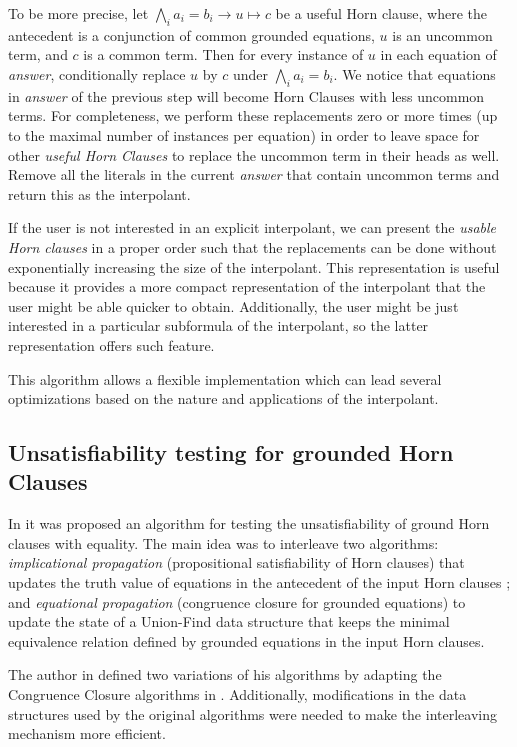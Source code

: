 \documentclass[10pt, sigconf,authordraft]{acmart}
\begin{document}
\begin{itemize}
  To be more precise, let $\bigwedge_i a_i = b_i \rightarrow u \mapsto c$ be a useful Horn clause,
  where the antecedent is a conjunction of common grounded equations, $u$ is an uncommon term,
  and $c$ is a common term.
  Then for every instance of $u$ in each equation of \emph{answer}, conditionally replace $u$
  by $c$ under $\bigwedge_i a_i = b_i$.
  We notice that equations in \emph{answer}  of the previous step will become Horn Clauses with
  less uncommon terms. For completeness, we perform these replacements zero or more times
  (up to the maximal number of instances per equation) in order to leave space for other
  \emph{useful Horn Clauses} to replace the uncommon term in their heads as well.
  Remove all the literals in the current \emph{answer} that contain uncommon terms and return this
  as the interpolant.
\end{itemize}

If the user is not interested in an explicit interpolant, we can present the \emph{usable Horn
  clauses} in a proper order such that the replacements can be done without exponentially increasing
the size of the interpolant. This representation is useful because it provides a more compact
representation of the interpolant that the user might be able quicker to obtain.
Additionally, the user might be just interested in a particular subformula of the interpolant, so the
latter representation offers such feature.

This algorithm allows a flexible implementation which can lead several optimizations
based on the nature and applications of the interpolant.

\subsection{Unsatisfiability testing for grounded Horn Clauses}

In \cite{GALLIER1987233} it was proposed an algorithm for testing the unsatisfiability
of ground Horn clauses with equality. The main idea was to interleave two algorithms: \emph{implicational propagation}
(propositional satisfiability of Horn clauses) that updates the truth value of equations
in the antecedent of the input Horn clauses \cite{DOWLING1984267}; and \emph{equational propagation} (congruence closure
for grounded equations) to update the state of a Union-Find data structure \cite{10.1145/364099.364331}
that keeps the minimal equivalence relation defined by grounded equations in the input Horn clauses.

The author in \cite{GALLIER1987233} defined two variations of his algorithms by adapting
the Congruence Closure algorithms in \cite{10.1145/322217.322228, 10.1145/322186.322198}.
Additionally, modifications in the data structures used by the original algorithms were needed
to make the interleaving mechanism more efficient.
\end{document}

